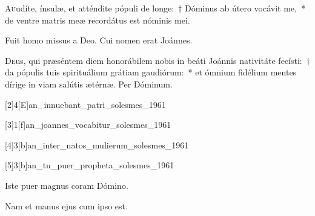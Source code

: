 \documentclass[vesperale_romanum.tex]{subfiles}
\begin{document}

\lettrine{A}{u}udíte, ínsulæ, et atténdite pópuli de longe:~† Dóminus ab útero vocávit me,~* de ventre matris meæ recordátus est nóminis mei.

\label{hy_ut_queant_laxis} \hymnus



\vv Fuit homo missus a Deo. \rr Cui nomen erat Joánnes.

\label{an_ingresso_zacharia_june_24_solesmes_1961}
{}


\oratio

\lettrine{D}{e}us, qui præséntem diem honorábilem nobis in beáti Joánnis nativitáte fecísti:~† da pópulis tuis spirituálium grátiam gaudiórum:~* et ómnium fidélium mentes dírige in viam salútis ætérnæ.
Per Dóminum.




[2]{4}[E]{an_innuebant_patri_solesmes_1961}

[3]{1}[f]{an_joannes_vocabitur_solesmes_1961}


[4]{3}[b]{an_inter_natos_mulierum_solesmes_1961}

[5]{3}[b]{an_tu_puer_propheta_solesmes_1961}


\vv Iste puer magnus coram Dómino.

\rr Nam et manus ejus cum ipso est.

\label{an_puer_qui_natus_est_solesmes_1961}

\commemoration
\end{document}

